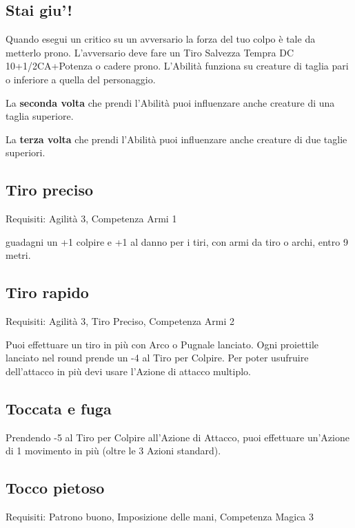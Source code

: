 \documentclass[a4paper,11pt,twoside,openany]{book}
\begin{document}
\subsection{Stai giu'!}

Quando esegui un critico su un avversario la forza del tuo colpo è tale da metterlo prono. L'avversario deve fare un Tiro Salvezza Tempra DC 10+1/2CA+Potenza o cadere prono. L'Abilità funziona su creature di taglia pari o inferiore a quella del personaggio.

La \textbf{seconda volta} che prendi l'Abilità puoi influenzare anche creature di una taglia superiore.

La \textbf{terza volta} che prendi l'Abilità puoi influenzare anche creature di due taglie superiori.

\subsection{Tiro preciso}

Requisiti: Agilità 3, Competenza Armi 1

guadagni un +1 colpire e +1 al danno per i tiri, con armi da tiro o archi, entro 9 metri.

\subsection{Tiro rapido}

Requisiti: Agilità 3, Tiro Preciso, Competenza Armi 2

Puoi effettuare un tiro in più con Arco o Pugnale lanciato. Ogni
proiettile lanciato nel round prende un -4 al Tiro per Colpire. Per
poter usufruire dell'attacco in più devi usare l'Azione di attacco
multiplo.

\subsection{Toccata e fuga}

Prendendo -5 al Tiro per Colpire all'Azione di Attacco, puoi effettuare un'Azione di 1 movimento in più (oltre le 3 Azioni standard).

\subsection{Tocco pietoso}

Requisiti: Patrono buono, Imposizione delle mani, Competenza Magica 3
\end{document}
